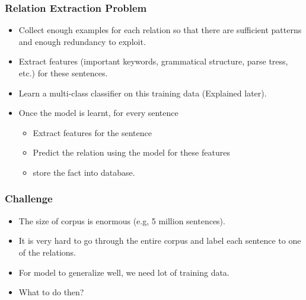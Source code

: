 \documentclass{beamer}
\begin{document}
\begin{frame}
 \frametitle{Relation Extraction Problem}
 
  \begin{itemize}
   \item Collect enough examples for each relation so that there are sufficient patterns and enough redundancy to exploit.
   \item Extract features (important keywords, grammatical structure, parse tress, etc.) for these sentences.
   \item Learn a multi-class classifier on this training data (Explained later).
   \item Once the model is learnt, for every sentence 
    \begin{itemize}
	\item Extract features for the sentence
	\item Predict the relation using the model for these features
	\item store the fact into database.
     \end{itemize}
  \end{itemize}

 
\end{frame}

\begin{frame}
 
 \frametitle{Challenge}
 \begin{itemize}
  \item The size of corpus is enormous (e.g, 5 million sentences).  \pause
  \item It is very hard to go through the entire corpus and label each sentence to one of the relations. \pause
  \item For model to generalize well, we need lot of training data. \pause
  \item What to do then?
 \end{itemize}

 
\end{frame}
\end{document}
